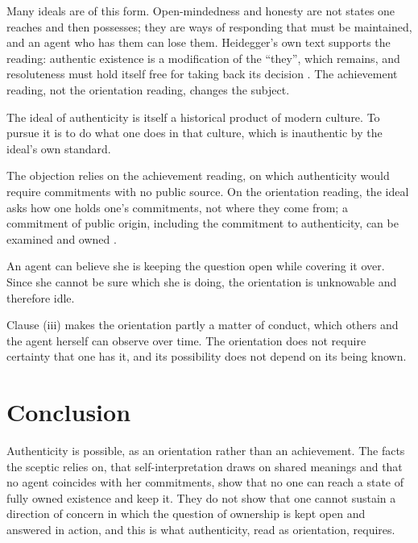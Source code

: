 \documentclass{situationist-preprint}
\begin{document}
\begin{reply}
Many ideals are of this form. Open-mindedness and honesty are not states one reaches and then possesses; they are ways of responding that must be maintained, and an agent who has them can lose them. Heidegger's own text supports the reading: authentic existence is a modification of the \enquote{they}, which remains, and resoluteness must hold itself free for taking back its decision \citep[\S\S 27, 62]{Heidegger1927}. The achievement reading, not the orientation reading, changes the subject.
\end{reply}

\begin{objection}\label{o:soc}
The ideal of authenticity is itself a historical product of modern culture. To pursue it is to do what one does in that culture, which is inauthentic by the ideal's own standard.
\end{objection}

\begin{reply}
The objection relies on the achievement reading, on which authenticity would require commitments with no public source. On the orientation reading, the ideal asks how one holds one's commitments, not where they come from; a commitment of public origin, including the commitment to authenticity, can be examined and owned \citep{Taylor1991,Guignon2004}.
\end{reply}

\begin{objection}\label{o:sd}
An agent can believe she is keeping the question open while covering it over. Since she cannot be sure which she is doing, the orientation is unknowable and therefore idle.
\end{objection}

\begin{reply}
Clause (iii) makes the orientation partly a matter of conduct, which others and the agent herself can observe over time. The orientation does not require certainty that one has it, and its possibility does not depend on its being known.
\end{reply}

\section{Conclusion}

Authenticity is possible, as an orientation rather than an achievement. The facts the sceptic relies on, that self-interpretation draws on shared meanings and that no agent coincides with her commitments, show that no one can reach a state of fully owned existence and keep it. They do not show that one cannot sustain a direction of concern in which the question of ownership is kept open and answered in action, and this is what authenticity, read as orientation, requires.
\end{document}
